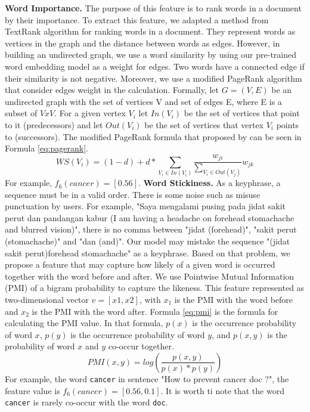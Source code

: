 \textbf{Word Importance.} The purpose of this feature is to rank words in a document by their importance. To extract this feature, we adapted a method from TextRank \cite{mihalcea2004textrank} algorithm for ranking words in a document. They represent words as vertices in the graph and the distance between words as edges. However, in building an undirected graph, we use a word similarity by using our pre-trained word embedding model as a weight for edges. Two words have a connected edge if their similarity is not negative. Moreover, we use a modified PageRank \cite{page1999pagerank} algorithm that consider edges weight in the calculation. Formally, let $G = (V, E)$ be an undirected graph with the set of vertices V and set of edges E, where E is a subset of $VxV$. For a given vertex $V_i$ let $In(V_i)$ be the set of vertices that point to it (predecessors) and let $Out(V_i)$ be the set of vertices that vertex $V_i$ points to (successors). The modified PageRank formula that proposed by \cite{mihalcea2004textrank} can be seen in Formula \ref{eq:pagerank}.
\begin{equation}\label{eq:pagerank}
WS(V_{i})=(1-d) + d * \sum_{V_{i} \in In(V_{i})} \frac{w_{ji}}{\sum_{V_{i} \in Out(V_{j})}}w_{jk}
\end{equation}
For example, $f_6(cancer) = [0.56]$.
\textbf{Word Stickiness.} As a keyphrase, a sequence must be in a valid order. There is some noise such as misuse punctuation by users. For example, "Saya mengalami pusing pada jidat sakit perut dan pandangan kabur (I am having a headache on forehead stomachache and blurred vision)", there is no comma between "jidat (forehead)", "sakit perut (stomachache)" and "dan (and)". Our model may mistake the sequence "(jidat sakit perut)forehead stomachache" as a keyphrase. Based on that problem, we propose a feature that may capture how likely of a given word is occurred together with the word before and after. We use Pointwise Mutual Information (PMI) of a bigram probability to capture the likeness. This feature represented as two-dimensional vector $v = [x1, x2]$, with $x_1$ is the PMI with the word before and $x_2$ is the PMI with the word after. Formula \ref{eq:pmi} is the formula for calculating the PMI value. In that formula, $p(x)$ is the occurrence probability of word $x$, $p(y)$ is the occurrence probability of word $y$, and $p(x, y)$ is the probability of word $x$ and $y$ co-occur together.
\begin{equation}\label{eq:pmi}
PMI(x,y)=log(\frac{p(x, y)}{p(x)*p(y)})
\end{equation}
For example, the word \texttt{cancer} in sentence "How to prevent cancer doc ?", the feature value is $f_6(cancer) = [0.56, 0.1]$. It is worth ti note that the word \texttt{cancer} is rarely co-occur with the word \texttt{doc}.


